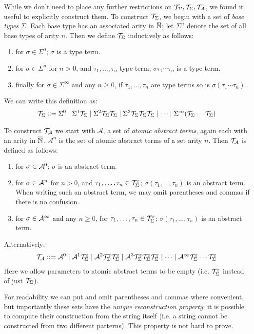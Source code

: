 \documentclass{llncs}
\begin{document}
While we don't need to place any further restrictions on $\mathcal T_{\mathcal P},\mathcal T_{\Sigma},\mathcal T_{\mathcal A}$, we found it useful to explicitly construct them.
To construct $\mathcal T_{\Sigma}$, we begin with a set of \textit{base types} $\Sigma$.
Each base type has an associated arity in $\overline{\mathbb N}$; let $\Sigma^n$ denote the set of all base types of arity $n$.
Then we define $\mathcal T_{\Sigma}$ inductively as follows:
\begin{enumerate}
    \item for $\sigma\in\Sigma^0$; $\sigma$ is a type term.
    \item for $\sigma\in\Sigma^n$ for $n>0$, and $\tau_1,\dots,\tau_n$ type term; $\sigma\tau_1\cdots\tau_n$ is a type term.
    \item finally for $\sigma\in\Sigma^\infty$ and any $n\geq0$, if $\tau_1,\dots,\tau_n$ are type terms so is $\sigma(\tau_1\cdots\tau_n)$.
\end{enumerate}
We can write this definition as:
\[ \mathcal T_{\Sigma} \mathrel{{\mathop:}{\mathop:}{=}} \Sigma^0 \mid \Sigma^1\mathcal T_{\Sigma} \mid \Sigma^2\mathcal T_{\Sigma}\mathcal T_{\Sigma} \mid \Sigma^3\mathcal T_{\Sigma}\mathcal T_{\Sigma}\mathcal T_{\Sigma} \mid \cdots \mid \Sigma^\infty(\mathcal T_{\Sigma}\cdots\mathcal T_{\Sigma}) \]

To construct $\mathcal T_{\mathcal A}$ we start with $\mathcal A$, a set of \textit{atomic abstract terms}, again each with an arity in $\overline{\mathbb N}$.
$\mathcal A^n$ is the set of atomic abstract terms of a set arity $n$.
Then $\mathcal T_{\mathcal A}$ is defined as follows:
\begin{enumerate}
    \item for $\sigma\in\mathcal{A}^0$; $\sigma$ is an abstract term.
    \item for $\sigma\in\mathcal{A}^n$ for $n>0$, and $\tau_1,\dots,\tau_n\in\mathcal T_{\Sigma}^\varepsilon$; $\sigma(\tau_1,\dots,\tau_n)$ is an abstract term.
        When writing such an abstract term, we may omit parentheses and commas if there is no confusion.
    \item for $\sigma\in\mathcal{A}^\infty$ and any $n\geq0$, for $\tau_1,\dots,\tau_n\in\mathcal T_{\Sigma}^\varepsilon$; $\sigma(\tau_1,\dots,\tau_n)$ is an abstract term.
\end{enumerate}
Alternatively:
\[ \mathcal T_{\mathcal A} \mathrel{{\mathop:}{\mathop:}{=}} \mathcal A^0\mid\mathcal A^1\mathcal T_{\Sigma}^\varepsilon\mid\mathcal A^2\mathcal T_{\Sigma}^\varepsilon\mathcal T_{\Sigma}^\varepsilon\mid\mathcal A^3\mathcal T_{\Sigma}^\varepsilon\mathcal T_{\Sigma}^\varepsilon\mathcal T_{\Sigma}^\varepsilon\mid\cdots\mid
\mathcal A^\infty\mathcal T_{\Sigma}^\varepsilon\cdots\mathcal T_{\Sigma}^\varepsilon \]
Here we allow parameters to atomic abstract terms to be empty (i.e. $\mathcal T_{\Sigma}^\varepsilon$ instead of just $\mathcal T_{\Sigma}$).

For readability we can put and omit parentheses and commas where convenient, but importantly these sets have the \textit{unique reconstruction property}:
it is possible to compute their construction from the string itself (i.e. a string cannot be constructed from two different patterns).
This property is not hard to prove.
\end{document}
